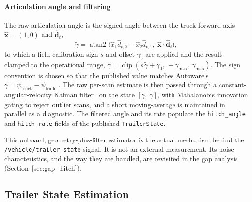 \paragraph{Articulation angle and filtering} The raw articulation angle is the signed angle between the truck-forward axis $\hat{\mathbf{x}} = (1, 0)$ and $\hat{\mathbf{d}}_t$,
\begin{equation}
    \tilde\gamma = \operatorname{atan2}\!\big(\hat{x}_1 \hat{d}_{t,2} - \hat{x}_2 \hat{d}_{t,1},\; \hat{\mathbf{x}} \cdot \hat{\mathbf{d}}_t\big),
    \label{eq:hitch_raw_angle}
\end{equation}
to which a field-calibration sign $s$ and offset $\gamma_0$ are applied and the result clamped to the operational range, $\gamma = \operatorname{clip}(s\,\tilde\gamma + \gamma_0,\, -\gamma_\text{max},\, \gamma_\text{max})$. The sign convention is chosen so that the published value matches Autoware's $\gamma = \psi_\text{truck} - \psi_\text{trailer}$. The raw per-scan estimate is then passed through a constant-angular-velocity Kalman filter~\cite{kalman1960new} on the state $[\gamma,\ \dot\gamma]$, with Mahalanobis innovation gating to reject outlier scans, and a short moving-average is maintained in parallel as a diagnostic. The filtered angle and its rate populate the \texttt{hitch\_angle} and \texttt{hitch\_rate} fields of the published \texttt{TrailerState}.

This onboard, geometry-plus-filter estimator is the actual mechanism behind the \texttt{/vehicle/trailer\_state} signal. It is not an external measurement. Its noise characteristics, and the way they are handled, are revisited in the gap analysis (Section~\ref{sec:gap_hitch}).

\subsection{Trailer State Estimation}

